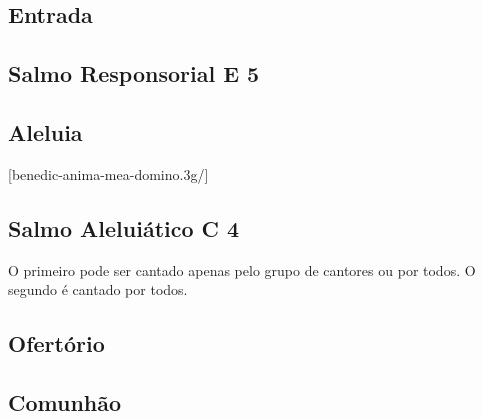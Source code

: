 
\subsection{Entrada}\label{subsection:proprium-sanctorum/sanctis-michaelis-gabrielis-et-raphaelis-archangelorum/introitus}

\AllowPageFlush

\subsection[Salmo Responsorial]{Salmo Responsorial \textmd{E 5 \protect\GreStar}}\label{subsection:proprium-sanctorum/sanctis-michaelis-gabrielis-et-raphaelis-archangelorum/psalmus-responsorius}

\subsection{Aleluia}\label{subsection:proprium-sanctorum/sanctis-michaelis-gabrielis-et-raphaelis-archangelorum/alleluia}
[benedic-anima-mea-domino.3g/]

\AllowPageFlush

\subsection[Salmo Aleluiático]{Salmo Aleluiático \textmd{C 4}}\label{subsection:proprium-sanctorum/sanctis-michaelis-gabrielis-et-raphaelis-archangelorum/psalmus-alleluiaticus}
\begin{rubrica}
  O primeiro {\normalfont\Rbar} pode ser cantado apenas pelo grupo de cantores ou por todos. O segundo {\normalfont\Rbar} é cantado por todos.
\end{rubrica}

\AllowPageFlush

\subsection{Ofertório}\label{subsection:proprium-sanctorum/sanctis-michaelis-gabrielis-et-raphaelis-archangelorum/offertorium}

\AllowPageFlush

\subsection{Comunhão}\label{subsection:proprium-sanctorum/sanctis-michaelis-gabrielis-et-raphaelis-archangelorum/communio}
